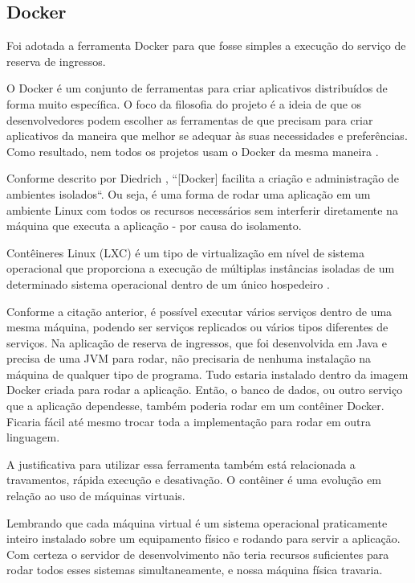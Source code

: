 \subsection{Docker}\label{docker}

Foi adotada a ferramenta Docker para que fosse simples a execução do serviço de reserva de ingressos.

\begin{citacao}
O Docker é um conjunto de ferramentas para criar aplicativos distribuídos de forma muito específica.
O foco da filosofia do projeto é a ideia de que os desenvolvedores podem escolher as ferramentas
de que precisam para criar aplicativos da maneira que melhor se adequar às suas necessidades e preferências.
Como resultado, nem todos os projetos usam o Docker da mesma maneira \cite{solomon-hykes}.
\end{citacao}

Conforme descrito por Diedrich \cite{mundodocker-o-que-e-docker}, ``[Docker] facilita a criação e administração de ambientes isolados``.
Ou seja, é uma forma de rodar uma aplicação em um ambiente Linux com todos os recursos necessários sem interferir
diretamente na máquina que executa a aplicação - por causa do isolamento.

\begin{citacao}
Contêineres Linux (LXC) é um tipo de
virtualização em nível de sistema operacional que proporciona a execução de múltiplas instâncias isoladas de um determinado
sistema operacional dentro de um único hospedeiro \cite{sinestec-01}.
\end{citacao}

Conforme a citação anterior, é possível executar vários serviços dentro de uma mesma máquina, podendo ser serviços
replicados ou vários tipos diferentes de serviços.
Na aplicação de reserva de ingressos, que foi desenvolvida em Java e precisa de uma JVM para rodar, não precisaria
de nenhuma instalação na máquina de qualquer tipo de programa.
Tudo estaria instalado dentro da imagem Docker criada para rodar a aplicação.
Então, o banco de dados, ou outro serviço que a aplicação dependesse, também poderia rodar em um contêiner Docker.
Ficaria fácil até mesmo trocar toda a implementação para rodar em outra linguagem.

A justificativa para utilizar essa ferramenta também está relacionada a travamentos, rápida execução e desativação.
O contêiner é uma evolução em relação ao uso de máquinas virtuais.

\begin{citacao}
Lembrando que cada máquina virtual é um sistema operacional praticamente inteiro instalado sobre um equipamento físico e
rodando para servir a aplicação. Com certeza o servidor de desenvolvimento não teria recursos suficientes para rodar
todos esses sistemas simultaneamente, e nossa máquina física travaria\cite{aprendendo-docker}.
\end{citacao}



